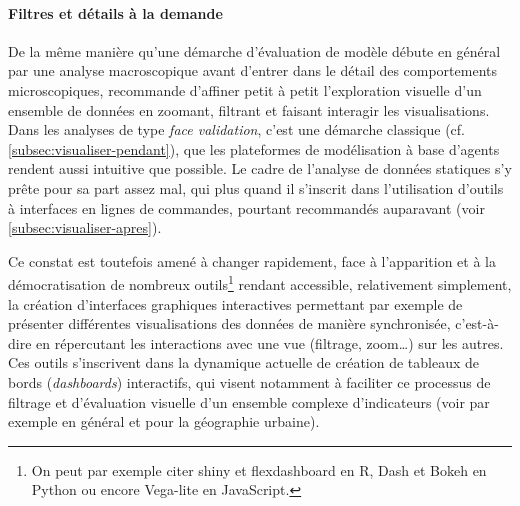 \documentclass[a4paper, 12pt]{article}
\begin{document}
\paragraph{Filtres et \og détails à la demande\fg{} \label{par:interaction}}

De la même manière qu'une démarche d'évaluation de modèle débute en général par une analyse macroscopique avant d'entrer dans le détail des comportements microscopiques, \textcite{shneiderman1996eyes} recommande d'affiner petit à petit l'exploration visuelle d'un ensemble de données en \og zoomant\fg{}, filtrant et faisant interagir les visualisations.
Dans les analyses de type \textit{face validation}, c'est une démarche classique (cf. \cref{subsec:visualiser-pendant}), que les plateformes de modélisation à base d'agents rendent aussi intuitive que possible.
Le cadre de l'analyse de données statiques s'y prête pour sa part assez mal, qui plus quand il s'inscrit dans l'utilisation d'outils à interfaces en lignes de commandes, pourtant recommandés auparavant (voir \cref{subsec:visualiser-apres}).

Ce constat est toutefois amené à changer rapidement, face à l'apparition et à la démocratisation de nombreux outils\footnote{
	On peut par exemple citer \textsf{shiny} \autocite{chang_shiny_2017} et \textsf{flexdashboard} \autocite{iannone_flexdashboard_2018} en \textsf{R}, \textsf{Dash} \autocite{plotly_dash_2017} et \textsf{Bokeh} \autocite{bokeh2014bokeh} en \textsf{Python} ou encore \textsf{Vega-lite} \autocite{satyanarayan2017vega} en \textsf{JavaScript}.
} rendant accessible, relativement simplement, la création d'interfaces graphiques interactives permettant par exemple de présenter différentes visualisations des données de manière synchronisée, c'est-à-dire en répercutant les interactions avec une vue (filtrage, zoom\ldots) sur les autres.
Ces outils s'inscrivent dans la dynamique actuelle de création de \og tableaux de bords\fg{} (\textit{dashboards}) interactifs, qui visent notamment à faciliter ce processus de filtrage et d'évaluation visuelle d'un ensemble complexe d'indicateurs (voir par exemple \textcite{few_information_2006} en général et \textcite{kitchin_knowing_2015} pour la géographie urbaine).
\end{document}

